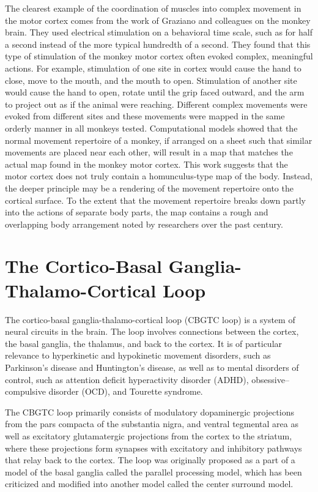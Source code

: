 The clearest example of the coordination of muscles into complex movement in the motor cortex comes from the work of Graziano and colleagues on the monkey brain. They used electrical stimulation on a behavioral time scale, such as for half a second instead of the more typical hundredth of a second. They found that this type of stimulation of the monkey motor cortex often evoked complex, meaningful actions. For example, stimulation of one site in cortex would cause the hand to close, move to the mouth, and the mouth to open. Stimulation of another site would cause the hand to open, rotate until the grip faced outward, and the arm to project out as if the animal were reaching. Different complex movements were evoked from different sites and these movements were mapped in the same orderly manner in all monkeys tested. Computational models showed that the normal movement repertoire of a monkey, if arranged on a sheet such that similar movements are placed near each other, will result in a map that matches the actual map found in the monkey motor cortex. This work suggests that the motor cortex does not truly contain a homunculus-type map of the body. Instead, the deeper principle may be a rendering of the movement repertoire onto the cortical surface. To the extent that the movement repertoire breaks down partly into the actions of separate body parts, the map contains a rough and overlapping body arrangement noted by researchers over the past century.

\hypertarget{the-cortico-basal-ganglia-thalamo-cortical-loop}{%
\section{The Cortico-Basal Ganglia-Thalamo-Cortical Loop}\label{the-cortico-basal-ganglia-thalamo-cortical-loop}}

The cortico-basal ganglia-thalamo-cortical loop (CBGTC loop) is a system of neural circuits in the brain. The loop involves connections between the cortex, the basal ganglia, the thalamus, and back to the cortex. It is of particular relevance to hyperkinetic and hypokinetic movement disorders, such as Parkinson's disease and Huntington's disease, as well as to mental disorders of control, such as attention deficit hyperactivity disorder (ADHD), obsessive--compulsive disorder (OCD), and Tourette syndrome.

The CBGTC loop primarily consists of modulatory dopaminergic projections from the pars compacta of the substantia nigra, and ventral tegmental area as well as excitatory glutamatergic projections from the cortex to the striatum, where these projections form synapses with excitatory and inhibitory pathways that relay back to the cortex. The loop was originally proposed as a part of a model of the basal ganglia called the parallel processing model, which has been criticized and modified into another model called the center surround model.

